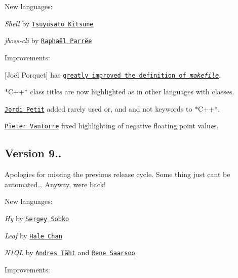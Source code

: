 New languages\+:


\begin{DoxyItemize}
\item {\itshape Shell} by \href{https://github.com/MakeNowJust}{\tt Tsuyusato Kitsune}
\item {\itshape jboss-\/cli} by \href{https://github.com/rparree}{\tt Raphaël Parrëe}
\end{DoxyItemize}

Improvements\+:


\begin{DoxyItemize}
\item \mbox{[}Joël Porquet\mbox{]} has \href{https://github.com/isagalaev/highlight.js/commit/5b3e0e68bfaae282faff6697d6a490567fa9d44b}{\tt greatly improved the definition of {\itshape makefile}}.
\item $\ast$\+C++$\ast$ class titles are now highlighted as in other languages with classes.
\item \href{https://github.com/jordi-petit}{\tt Jordi Petit} added rarely used {\ttfamily or}, {\ttfamily and} and {\ttfamily not} keywords to $\ast$\+C++$\ast$.
\item \href{https://github.com/NuclearCookie}{\tt Pieter Vantorre} fixed highlighting of negative floating point values.
\end{DoxyItemize}

\subsection*{Version 9..}

Apologies for missing the previous release cycle. Some thing just can\textquotesingle{}t be automated… Anyway, we\textquotesingle{}re back!

New languages\+:


\begin{DoxyItemize}
\item {\itshape Hy} by \href{https://github.com/profitware}{\tt Sergey Sobko}
\item {\itshape Leaf} by \href{https://github.com/halechan}{\tt Hale Chan}
\item {\itshape N1\+QL} by \href{https://github.com/andrestaht}{\tt Andres Täht} and \href{https://github.com/nene}{\tt Rene Saarsoo}
\end{DoxyItemize}

Improvements\+:


